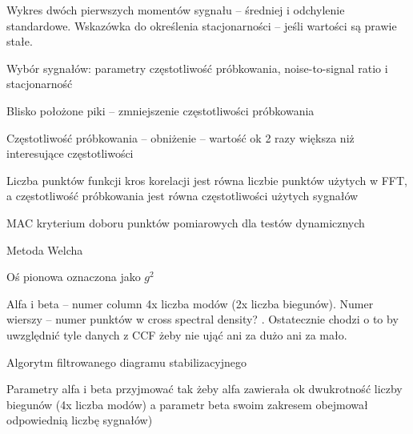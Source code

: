Wykres dwóch pierwszych momentów sygnału – średniej i odchylenie standardowe. Wskazówka do określenia stacjonarności – jeśli wartości są prawie stałe. \parencite{caicedo_practical_2011,bendat_random_2011}


Wybór sygnałów: parametry częstotliwość próbkowania, noise-to-signal ratio i stacjonarność


Blisko położone piki – zmniejszenie częstotliwości próbkowania \parencite{caicedo_practical_2011}


Częstotliwość próbkowania – obniżenie – wartość ok 2 razy większa niż interesujące częstotliwości \parencite{caicedo_practical_2011}


Liczba punktów funkcji kros korelacji jest równa liczbie punktów użytych w FFT, a częstotliwość próbkowania jest równa częstotliwości użytych sygnałów \parencite{caicedo_practical_2011}

MAC kryterium doboru punktów pomiarowych dla testów dynamicznych 


Metoda Welcha \parencite{welch_use_1967}


Oś pionowa oznaczona jako $g^2$ \parencite{caicedo_practical_2011}

Alfa i beta – numer column 4x liczba modów (2x liczba biegunów). Numer wierszy – numer punktów w cross spectral density? \parencite{caicedo_practical_2011}. Ostatecznie chodzi o to by uwzględnić tyle danych z CCF żeby nie ująć ani za dużo ani za mało.


Algorytm filtrowanego diagramu stabilizacyjnego  \parencite{caicedo_practical_2011}

Parametry alfa i beta \parencite{brownjohn_ambient_2010,caicedo_practical_2011,hollkamp_modal_2001,nayeri_study_2009,siringoringo_system_2008,szafranski_oddzialywania_2013}  przyjmować tak żeby alfa zawierała ok dwukrotność liczby biegunów (4x liczba modów) a parametr beta swoim zakresem obejmował odpowiednią liczbę sygnałów)

